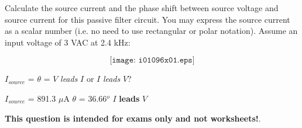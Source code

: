 

Calculate the source current and the phase shift between source voltage and source current for this passive filter circuit.  You may express the source current as a scalar number (i.e. no need to use rectangular or polar notation).  Assume an input voltage of 3 VAC at 2.4 kHz:

$$\texttt{[image: i01096x01.eps]}$$

$I_{source}$ = \hskip 100pt $\theta$ = \hskip 100pt $V$ {\it leads} $I$ or $I$ {\it leads} $V$?  

\vskip 10pt







$I_{source}$ = 891.3 $\mu$A \hskip 100pt $\theta$ = 36.66$^{o}$ \hskip 100pt $I$ {\bf leads} $V$ 







{\bf This question is intended for exams only and not worksheets!}.



